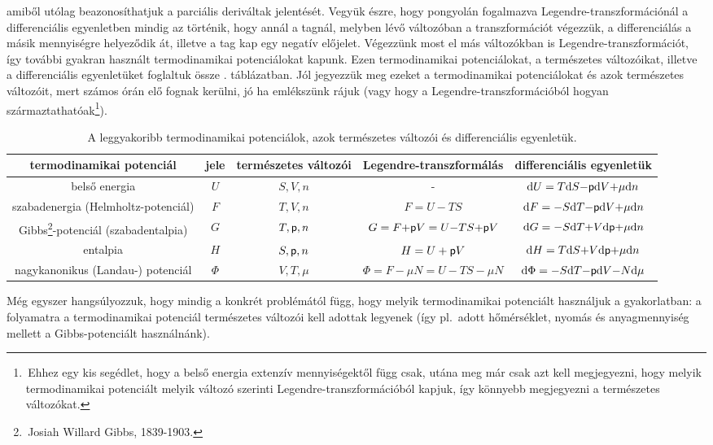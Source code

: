 amiből utólag beazonosíthatjuk a parciális deriváltak jelentését. Vegyük észre, hogy pongyolán fogalmazva Legendre-transzformációnál a differenciális egyenletben mindig az történik, hogy annál a tagnál, melyben lévő változóban a transzformációt végezzük, a differenciálás a másik mennyiségre helyeződik át, illetve a tag kap egy negatív előjelet.
Végezzünk most el más változókban is Legendre-transzformációt, így további gyakran használt termodinamikai potenciálokat kapunk. Ezen termodinamikai potenciálokat, a természetes változóikat, illetve a differenciális egyenletüket foglaltuk össze . táblázatban. Jól jegyezzük meg ezeket a termodinamikai potenciálokat és azok természetes változóit, mert számos órán elő fognak kerülni, jó ha emlékszünk rájuk (vagy hogy a Legendre-transzformációból hogyan származtathatóak\footnote{\,Ehhez egy kis segédlet, hogy a belső energia extenzív mennyiségektől függ csak, utána meg már csak azt kell megjegyezni, hogy melyik termodinamikai potenciált melyik változó szerinti Legendre-transzformációból kapjuk, így könnyebb megjegyezni a természetes változókat.}).

\begin{table}[h!]
\centering
\begin{adjustbox}{width=1.15\textwidth, center=\textwidth}
\begin{tabular}{|c||c|c|c|c|} \hline
termodinamikai potenciál & jele & természetes változói & Legendre-transzformálás & differenciális egyenletük\\ \hline\hline
belső energia & $U$ & $S,V,n$ &  - & $\mathrm{d}U = T\mathrm{d}S{-}\mathsf p \mathrm{d}V {+} \mu\mathrm{d}n$ \\ \hline
szabadenergia (Helmholtz-potenciál) & $F$ & $T,V,n$ & $F = U-TS$ & $\mathrm{d}F = {-}S\mathrm{d}T{-}\mathsf p\mathrm{d}V {+} \mu\mathrm{d}n$\\ \hline
Gibbs\footnote{\,Josiah Willard Gibbs, 1839-1903.}-potenciál (szabadentalpia) & $G$ & $T,\mathsf p,n$ & $G=F{+}\mathsf p V = U{-}TS{+}\mathsf p V$ & $\mathrm{d}G = -S\mathrm{d}T {+}V\mathrm{d}\mathsf p {+}\mu\mathrm{d}n$\\ \hline
entalpia & $H$ & $S,\mathsf p,n$ & $H=U+\mathsf p V$ & $\mathrm{d}H = T\mathrm{d}S {+} V\mathrm{d}\mathsf p {+} \mu \mathrm{d}n$\\ \hline
nagykanonikus (Landau-) potenciál & $\Phi$ & $V,T,\mu$ & $\Phi = F{-}\mu N=U{-}TS{-}\mu N$ & $\mathrm{d}\Phi = {-}S\mathrm{d}T{-}\mathsf p \mathrm{d}V{-}N\mathrm{d}\mu$\\ \hline
\end{tabular}
\end{adjustbox}
\caption{A leggyakoribb termodinamikai potenciálok, azok természetes változói és differenciális egyenletük.}
\label{tab:termo_pot}
\end{table}
Még egyszer hangsúlyozzuk, hogy mindig a konkrét problémától függ, hogy melyik termodinamikai potenciált használjuk a gyakorlatban: a folyamatra a termodinamikai potenciál természetes változói kell adottak legyenek (így pl.\ adott hőmérséklet, nyomás és anyagmennyiség mellett a Gibbs-potenciált használnánk).
